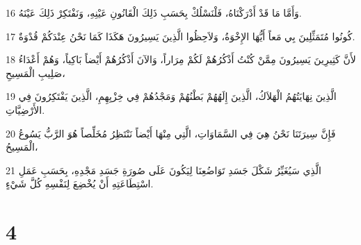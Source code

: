 \par 16 وَأَمَّا مَا قَدْ أَدْرَكْنَاهُ، فَلْنَسْلُكْ بِحَسَبِ ذَلِكَ الْقَانُونِ عَيْنِهِ، وَنَفْتَكِرْ ذَلِكَ عَيْنَهُ.
\par 17 كُونُوا مُتَمَثِّلِينَ بِي مَعاً أَيُّهَا الإِخْوَةُ، وَلاَحِظُوا الَّذِينَ يَسِيرُونَ هَكَذَا كَمَا نَحْنُ عِنْدَكُمْ قُدْوَةٌ.
\par 18 لأَنَّ كَثِيرِينَ يَسِيرُونَ مِمَّنْ كُنْتُ أَذْكُرُهُمْ لَكُمْ مِرَاراً، وَالآنَ أَذْكُرُهُمْ أَيْضاً بَاكِياً، وَهُمْ أَعْدَاءُ صَلِيبِ الْمَسِيحِ،
\par 19 الَّذِينَ نِهَايَتُهُمُ الْهَلاَكُ، الَّذِينَ إِلَهُهُمْ بَطْنُهُمْ وَمَجْدُهُمْ فِي خِزْيِهِمِ، الَّذِينَ يَفْتَكِرُونَ فِي الأَرْضِيَّاتِ.
\par 20 فَإِنَّ سِيرَتَنَا نَحْنُ هِيَ فِي السَّمَاوَاتِ، الَّتِي مِنْهَا أَيْضاً نَنْتَظِرُ مُخَلِّصاً هُوَ الرَّبُّ يَسُوعُ الْمَسِيحُ،
\par 21 الَّذِي سَيُغَيِّرُ شَكْلَ جَسَدِ تَوَاضُعِنَا لِيَكُونَ عَلَى صُورَةِ جَسَدِ مَجْدِهِ، بِحَسَبِ عَمَلِ اسْتِطَاعَتِهِ أَنْ يُخْضِعَ لِنَفْسِهِ كُلَّ شَيْءٍ.

\chapter{4}


